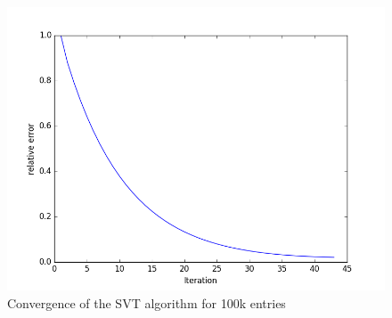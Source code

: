 \documentclass{article}
\begin{document}
\begin{figure}[!ht]
  \includegraphics[width=\textwidth,keepaspectratio=true]{movielens/convergence-svt-u1.png}
  \caption{Convergence of the SVT algorithm for 100k entries}
  \label{fig:convergence-svt}
\end{figure}


{}

\end{document}
